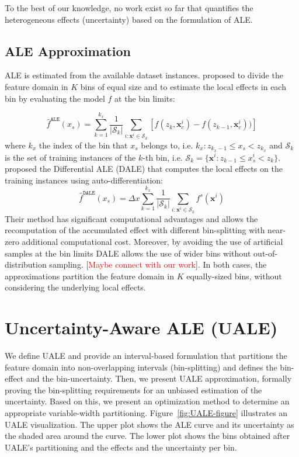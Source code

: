 \documentclass[twoside]{article}
\newcommand{\xc}{\mathbf{x}_c}
\newcommand{\xb}{\mathbf{x}}
\newcommand{\todo}[1]{[\textcolor{red}{#1}]}
\begin{document}
To the best of our knowledge, no work exist so far that quantifies the
heterogeneous effects (uncertainty) based on the formulation of ALE.

\subsection{ALE Approximation}
\label{sec:ale-approximation}

ALE is estimated from the available dataset instances. \citep{apley2020visualizing} proposed to divide the feature
domain in \(K\) bins of equal size and to estimate the local effects
in each bin by evaluating the model \(f\) at the bin limits:

\begin{equation}
  \label{eq:ALE_accumulated_mean_est}
  \hat{f}^{\mathtt{ALE}}(x_s) = \sum_{k=1}^{k_x} \frac{1}{|\mathcal{S}_k|} \sum_{i:\mathbf{x}^i \in
    \mathcal{S}_k} \left [ f(z_{k}, \xc^i) - f(z_{k-1}, \xc^i)) \right ]
\end{equation}
%
where \(k_x\) the index of the bin that \(x_s\) belongs to,
i.e. \(k_x: z_{k_x-1} \leq x_s < z_{k_x} \) and \(\mathcal{S}_k\) is
the set of training instances of the \(k\)-th bin, i.e.
\( \mathcal{S}_k = \{ \xb^i : z_{k-1} \leq x^i_s < z_{k} \}
\). \citep{gkolemis22} proposed the Differential ALE (DALE) that
computes the local effects on the training instances using
auto-differentiation:
\begin{equation}  \label{eq:DALE_accumulated_mean_est}
  \hat{f}^{\mathtt{DALE}}(x_s) = \Delta x \sum_{k=1}^{k_x} \frac{1}{|\mathcal{S}_k|} \sum_{i:\mathbf{x}^i \in
    \mathcal{S}_k} f^s(\mathbf{x}^i)
\end{equation}
%
Their method has significant computational advantages and allows the
recomputation of the accumulated effect with different bin-splitting
with near-zero additional computational cost. Moreover, by avoiding
the use of artificial samples at the bin limits DALE allows the use of
wider bins without out-of-distribution sampling. \todo{Maybe connect with our work}. In both cases, the
approximations partition the feature domain in \(K\) equally-sized
bins, without considering the underlying local effects.


\section{Uncertainty-Aware ALE (UALE)}
\label{sec:UALE}

We define UALE and provide an interval-based formulation that
partitions the feature domain into non-overlapping intervals
(bin-splitting) and defines the bin-effect and the
bin-uncertainty. Then, we present UALE approximation, formally proving
the bin-splitting requirements for an unbiased estimation of the
uncertainty. Based on this, we present an optimization method to
determine an appropriate variable-width
partitioning. Figure~\ref{fig:UALE-figure} illustrates an UALE
visualization. The upper plot shows the ALE curve and its uncertainty
as the shaded area around the curve. The lower plot shows the bins
obtained after UALE's partitioning and the effects and the uncertainty
per bin.
\end{document}
